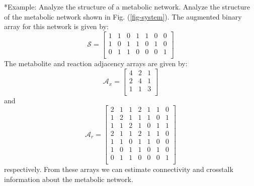 \documentclass[11pt]{article}
\makeatletter
\theoremstyle{definition}
\renewcommand\subsubsection{\@startsection
	{subsubsection}{2}{0mm}
	{-0.05in}
	{-0.5\baselineskip}
	{\normalfont\normalsize\itshape}}
\makeatother
\begin{document}
\subsubsection*{Example: Analyze the structure of a metabolic network.}
Analyze the structure of the metabolic network shown in Fig. (\ref{fig-system}).
The augmented binary array for this network is given by:
\begin{equation}
	\mathcal{S} =
	\begin{bmatrix}
		1 & 1 & 0 & 1 & 1 & 0 & 0 \\
		1 & 0 & 1 & 1 & 0 & 1 & 0 \\
		0 & 1 & 1 & 0 & 0 & 0 & 1 \\
	\end{bmatrix}
\end{equation}
The metabolite and reaction adjacency arrays are given by:
\begin{equation}
	\mathcal{A}_{x} =
	\begin{bmatrix}
		4  & 2 &  1 \\
		2  &  4 &  1 \\
	   	1  &  1  & 3 \\
	\end{bmatrix}
\end{equation}and
\begin{equation}
	\mathcal{A}_{r} =
	\begin{bmatrix}
		   2 &  1  &  1 &  2  & 1  & 1  & 0 \\
		   1 &  2  &  1 &  1  & 1  & 0  & 1 \\
		   1 &  1  &  2 &  1  & 0  & 1  & 1 \\
		   2 &  1  &  1 &  2  & 1  & 1  & 0 \\
		   1 &  1  &  0 &  1  & 1  & 0  & 0 \\
		   1 &  0  &  1 &  1  & 0  & 1  & 0 \\
		   0 &  1  &  1 &  0  & 0  & 0  & 1 \\
	\end{bmatrix}
\end{equation}respectively. From these arrays we can estimate connectivity and crosstalk information about the metabolic network.
\end{document}
